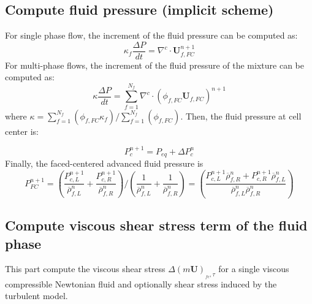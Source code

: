 \documentclass[preprint,12pt]{elsarticle}
\begin{document}
\subsection{\textsf{Compute fluid pressure (implicit scheme)}}
For single phase flow, the increment of the fluid pressure can be computed as:
%
\begin{equation}
  \kappa_f \frac{\Delta P}{dt} = \nabla^c \cdot \pmb{U}_{f,FC}^{n+1}
\end {equation}
%
For multi-phase flows, the increment of the fluid pressure of the mixture can be computed as:
%
\begin{equation}
  \kappa \frac{\Delta P}{dt} = \sum_{f=1}^{N_f}  \nabla^c \cdot (\phi_{f,FC} \pmb{U}_{f,FC})^{n+1}
\end {equation}
%
where $\kappa =  \sum_{f=1}^{N_f}  (\phi_{f,FC} \kappa_f) / \sum_{f=1}^{N_f}  (\phi_{f,FC})$. Then, the fluid pressure at cell center is:

\begin{equation}
  P_c^{n+1} = P_{eq} + \Delta P_c^{n}
\end {equation}
%
%
%
%
%
%
%
%
Finally, the faced-centered advanced fluid pressure is
%
%
\begin{equation}
    P_{FC}^{n+1} = (\frac{P_{c,L}^{n+1}}{\overline{\rho}_{f,L}^n} + \frac{P_{c,R}^{n+1}}{\overline{\rho}_{f,R}^n}) / (\frac{1}{\overline{\rho}_{f,L}^n} + \frac{1}{\overline{\rho}_{f,R}^n}) = (\frac{P_{c,L}^{n+1} \overline{\rho}_{f,R}^n + P_{c,R}^{n+1} \overline{\rho}_{f,L}^n}{\overline{\rho}_{f,L}^n \overline{\rho}_{f,R}^n})
\end {equation}
%
%
\subsection{\textsf{Compute viscous shear stress term of the fluid phase}}
This part compute the viscous shear stress $\Delta (m \pmb{U})_{_{fc},\tau}$ for a single viscous compressible Newtonian fluid and optionally shear stress induced by the turbulent model.
%
%
\end{document}
